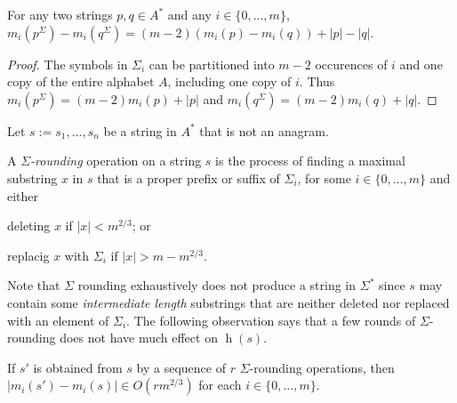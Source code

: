 \documentclass[kpfonts]{patmorin}
\DeclareMathOperator{\hist}{h}
\begin{document}
\begin{lem}
    For any two strings $p,q\in A^*$ and any $i\in\{0,\ldots,m\}$, $m_i(p^\Sigma)-m_i(q^\Sigma) = (m-2)(m_i(p)-m_i(q)) + |p|-|q|$.
\end{lem}

\begin{proof}
    The symbols in $\Sigma_i$ can be partitioned into $m-2$ occurences of $i$ and one copy of the entire alphabet $A$, including one copy of $i$.  Thus $m_i(p^\Sigma)=(m-2)m_i(p)+|p|$ and $m_i(q^\Sigma)=(m-2)m_i(q)+|q|$.
\end{proof}


\begin{lem}
    Let $s:=s_1,\ldots,s_n$ be a string in $A^*$ that is not an anagram.
\end{lem}


A \emph{$\Sigma$-rounding} operation on a string $s$ is the process of finding a maximal substring $x$ in $s$ that is a proper prefix or suffix of $\Sigma_i$, for some $i\in\{0,\ldots,m\}$ and either
\begin{inparaenum}[(i)]
    \item deleting $x$ if $|x|<m^{2/3}$; or
    \item replacig $x$ with $\Sigma_i$ if $|x|>m-m^{2/3}$.
\end{inparaenum}
Note that $\Sigma$ rounding exhaustively does not produce a string in $\Sigma^*$ since $s$ may contain some \emph{intermediate length} substrings that are neither deleted nor replaced with an element of $\Sigma_i$. The following observation says that a few rounds of $\Sigma$-rounding does not have much effect on $\hist(s)$.
\begin{obs}
    If $s'$ is obtained from $s$ by a sequence of $r$ $\Sigma$-rounding operations, then $|m_i(s')-m_i(s)|\in O(r m^{2/3})$ for each $i\in\{0,\ldots,m\}$.
\end{obs}
\end{document}
